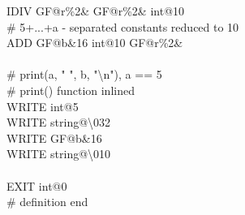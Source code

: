 \documentclass[12pt]{article}
\begin{document}
\begin{figure}
{IDIV GF@r\%2\& GF@r\%2\& int@10\\
\textcolor{comment}{\# 5+...+a - separated constants reduced to 10}\\
ADD GF@b\&16 int@10 GF@r\%2\&\\
\\
\textcolor{comment}{\# print(a, " ", b, "\textbackslash n"), a == 5}\\
\textcolor{comment}{\# print() function inlined}\\
WRITE int@5\\
WRITE string@\textbackslash 032\\
WRITE GF@b\&16\\
WRITE string@\textbackslash 010\\
\\
EXIT int@0\\
\textcolor{comment}{\# definition end\\}}
\vspace{20cm}
\end{figure}
	
\end{document}
